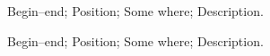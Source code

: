 \addwork%
{%
    Begin--end;%
    Position;%
    Some where;%
    Description.%
}%

\addwork%
{%
    Begin--end;%
    Position;%
    Some where;%
    Description.%
}%
